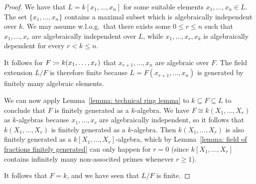 \begin{proof}
  We have that $L = k[x_1, \dotsc, x_n]$ for some suitable elements $x_1, \dotsc, x_n \in L$.
  The set $\{x_1, \dotsc, x_n\}$ contains a maximal subset which is algebraically independent over $k$.
  We may assume w.l.o.g.\ that there exists some $0 \leq r \leq n$ such that $x_1, \dotsc, x_r$ are algebraically independent over $L$, while $x_1, \dotsc, x_r, x_k$ is algebraically dependent for every $r < k \leq n$.
  
  It follows for $F \coloneqq k(x_1, \dotsc, x_r)$ that $x_{r+1}, \dotsc, x_n$ are algebraic over $F$.
  The field extension $L/F$ is therefore finite because $L = F(x_{r+1}, \dotsc, x_n)$ is generated by finitely many algebraic elements.
  
  We can now apply Lemma~\ref{lemma: technical ring lemma} to $k \subseteq F \subseteq L$ to conclude that $F$ is finitely generated as a $k$-algebra.
  We have $F \cong k(X_1, \dotsc, X_r)$ as $k$-algebras because $x_1, \dotsc, x_r$ are algebraically independent, so it follows that $k(X_1, \dotsc, X_r)$ is finitely generated as a $k$-algebra.
  Then $k(X_1, \dotsc, X_r)$ is also finitely generated as a $k[X_1, \dotsc, X_r]$-algebra, which by Lemma~\ref{lemma: field of fractions finitely generated} can only happen for $r = 0$ (since $k[X_1, \dotsc, X_r]$ contains infinitely many non-associted primes whenever $r \geq 1$).
  
  It follows that $F = k$, and we have seen that $L/F$ is finite.
\end{proof}

